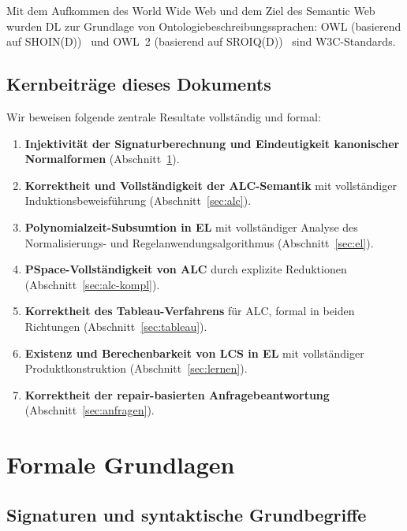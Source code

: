 ﻿\documentclass[a4paper,12pt]{article}
\theoremstyle{definition}
\theoremstyle{plain}
\theoremstyle{remark}
\begin{document}
Mit dem Aufkommen des World Wide Web und dem Ziel des Semantic Web
wurden DL zur Grundlage von Ontologiebeschreibungssprachen:
OWL (basierend auf \textsf{SHOIN(D)})~\cite{OWL1} und
OWL~2 (basierend auf \textsf{SROIQ(D)})~\cite{OWL2Primer}
sind W3C-Standards.

\subsection{Kernbeitr{\"{a}}ge dieses Dokuments}

Wir beweisen folgende zentrale Resultate vollst{\"{a}}ndig und formal:
\begin{enumerate}[label=(\Roman*)]
  \item \textbf{Injektivit{\"{a}}t der Signaturberechnung und Eindeutigkeit
        kanonischer Normalformen} (Abschnitt~\ref{sec:grundlagen}).
  \item \textbf{Korrektheit und Vollst{\"{a}}ndigkeit der ALC-Semantik}
        mit vollst{\"{a}}ndiger Induktionsbeweisf{\"{u}}hrung (Abschnitt~\ref{sec:alc}).
  \item \textbf{Polynomialzeit-Subsumtion in EL} mit vollst{\"{a}}ndiger
        Analyse des Normalisierungs- und Regelanwendungsalgorithmus
        (Abschnitt~\ref{sec:el}).
  \item \textbf{PSpace-Vollst{\"{a}}ndigkeit von ALC} durch explizite
        Reduktionen (Abschnitt~\ref{sec:alc-kompl}).
  \item \textbf{Korrektheit des Tableau-Verfahrens} f{\"{u}}r ALC,
        formal in beiden Richtungen (Abschnitt~\ref{sec:tableau}).
  \item \textbf{Existenz und Berechenbarkeit von LCS in EL}
        mit vollst{\"{a}}ndiger Produktkonstruktion (Abschnitt~\ref{sec:lernen}).
  \item \textbf{Korrektheit der repair-basierten Anfragebeantwortung}
        (Abschnitt~\ref{sec:anfragen}).
\end{enumerate}

\section{Formale Grundlagen}
\label{sec:grundlagen}

\subsection{Signaturen und syntaktische Grundbegriffe}
\end{document}
